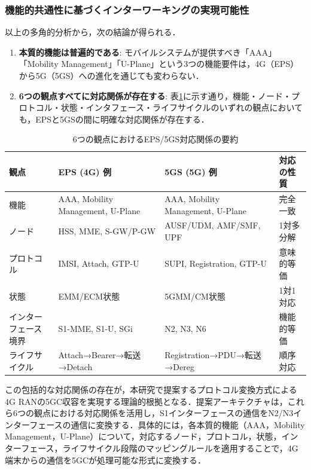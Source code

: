 \subsubsection{機能的共通性に基づくインターワーキングの実現可能性}

以上の多角的分析から，次の結論が得られる．

\begin{enumerate}
\item \textbf{本質的機能は普遍的である}: モバイルシステムが提供すべき「AAA」「Mobility Management」「U-Plane」という3つの機能要件は，4G（EPS）から5G（5GS）への進化を通じても変わらない．

\item \textbf{6つの観点すべてに対応関係が存在する}: 表\ref{tab:six_aspects_summary}に示す通り，機能・ノード・プロトコル・状態・インタフェース・ライフサイクルのいずれの観点においても，EPSと5GSの間に明確な対応関係が存在する．
\end{enumerate}

\begin{table}[htbp]
\centering
\caption{6つの観点におけるEPS/5GS対応関係の要約}
\label{tab:six_aspects_summary}
\begin{tabular}{|p{2.8cm}|p{4.5cm}|p{4.5cm}|p{2.5cm}|}
\hline
\textbf{観点} & \textbf{EPS (4G) 例} & \textbf{5GS (5G) 例} & \textbf{対応の性質} \\
\hline
機能 & AAA, Mobility Management, U-Plane & AAA, Mobility Management, U-Plane & 完全一致 \\
\hline
ノード & HSS, MME, S-GW/P-GW & AUSF/UDM, AMF/SMF, UPF & 1対多分解 \\
\hline
プロトコル & IMSI, Attach, GTP-U & SUPI, Registration, GTP-U & 意味的等価 \\
\hline
状態 & EMM/ECM状態 & 5GMM/CM状態 & 1対1対応 \\
\hline
インターフェース境界 & S1-MME, S1-U, SGi & N2, N3, N6 & 機能的等価 \\
\hline
ライフサイクル & Attach→Bearer→転送→Detach & Registration→PDU→転送→Dereg & 順序対応 \\
\hline
\end{tabular}
\end{table}

この包括的な対応関係の存在が，本研究で提案するプロトコル変換方式による4G RANの5GC収容を実現する理論的根拠となる．提案アーキテクチャは，これら6つの観点における対応関係を活用し，S1インターフェースの通信をN2/N3インターフェースの通信に変換する．具体的には，各本質的機能（AAA，Mobility Management，U-Plane）について，対応するノード，プロトコル，状態，インターフェース，ライフサイクル段階のマッピングルールを適用することで，4G端末からの通信を5GCが処理可能な形式に変換する．

